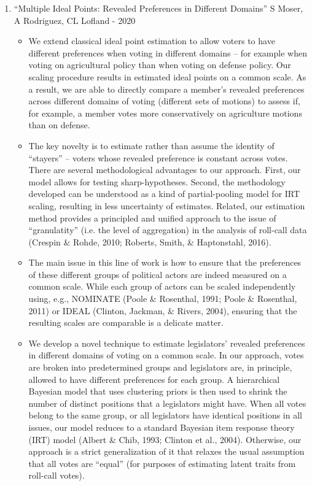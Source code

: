 \documentclass[a4paper,12pt]{article}
\begin{document}
\begin{enumerate}
\item “Multiple Ideal Points: Revealed Preferences in Different Domains” S Moser, A Rodriguez, CL Lofland - 2020
\begin{itemize}
\item We extend classical ideal point estimation to allow voters to have different preferences when voting in different domains – for example when voting on agricultural policy than when voting on defense policy. Our scaling procedure results in estimated ideal points on a common scale. As a result, we are able to directly compare a member’s revealed preferences across different domains of voting (different sets of motions) to assess if, for example, a member votes more conservatively on agriculture motions than on defense.  
\item The key novelty is to estimate rather than assume the identity of “stayers” – voters whose revealed preference is constant across votes. There are several methodological advantages to our approach. First, our model allows for testing sharp-hypotheses. Second, the methodology developed can be understood as a kind of partial-pooling model for IRT scaling, resulting in less uncertainty of estimates. Related, our estimation method provides a principled and unified approach to the issue of “granulatity” (i.e. the level of aggregation) in the analysis of roll-call data (Crespin \& Rohde, 2010; Roberts, Smith, \& Haptonstahl, 2016). 
\item The main issue in this line of work is how to ensure that the preferences of these different groups of political actors are indeed measured on a common scale. While each group of actors can be scaled independently using, e.g., NOMINATE (Poole \& Rosenthal, 1991; Poole \& Rosenthal, 2011) or IDEAL (Clinton, Jackman, \& Rivers, 2004), ensuring that the resulting scales are comparable is a delicate matter. 
\item We develop a novel technique to estimate legislators’ revealed preferences in different domains of voting on a common scale. In our approach, votes are broken into predetermined groups and legislators are, in principle, allowed to have different preferences for each group. A hierarchical Bayesian model that uses clustering priors is then used to shrink the number of distinct positions that a legislators might have. When all votes belong to the same group, or all legislators have identical positions in all issues, our model reduces to a standard Bayesian item response theory (IRT) model (Albert \& Chib, 1993; Clinton et al., 2004). Otherwise, our approach is a strict generalization of it that relaxes the usual assumption that all votes are “equal” (for purposes of estimating latent traits from roll-call votes). 

\end{itemize}
\end{enumerate}
\end{document}
